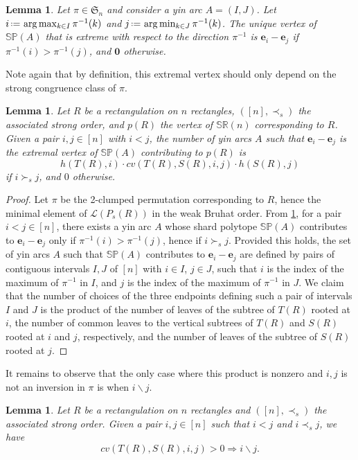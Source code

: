 \documentclass{amsart}
\newtheorem{lemma}[theorem]{Lemma}
\theoremstyle{definition}
\renewcommand{\b}[1]{{\boldsymbol{#1}}} %
\newcommand{\f}[1]{\mathfrak{#1}} %
\newcommand{\eqdef}{\mbox{\,\raisebox{0.2ex}{\scriptsize\ensuremath{\mathrm:}}\ensuremath{=}\,}} %
\renewcommand{\implies}{\Rightarrow} %
\newcommand{\polytope}[1]{\mathds{#1}} %
\newcommand{\SRP}{\polytope{SR}} %
\newcommand{\SP}{\polytope{SP}}
\begin{document}
\begin{lemma}
  \label{lem:yinminmax}
  Let $\pi\in\f{S}_n$ and consider a yin arc $A=(I,J)$.
  Let $i \eqdef \arg\max_{k\in I} \pi^{-1}(k)$ and $j \eqdef \arg\min_{k\in J} \pi^{-1}(k)$.
  The unique vertex of $\SP(A)$ that is extreme with respect to the direction $\pi^{-1}$
  is $\b{e}_i-\b{e}_j$ if $\pi^{-1}(i)>\pi^{-1}(j)$, and $\b{0}$ otherwise.
\end{lemma}

Note again that by definition, this extremal vertex should only depend on the strong congruence class of $\pi$.

\begin{lemma}
  Let $R$ be a rectangulation on $n$ rectangles, $([n],\prec_s)$ the associated strong order, and $p(R)$ the vertex of $\SRP(n)$ corresponding to $R$.
  Given a pair $i,j\in [n]$ with $i<j$, the number of yin arcs $A$ such that $\b{e}_i-\b{e}_j$
  is the extremal vertex of $\SP(A)$ contributing to $p(R)$ is
  \[
    h(T(R), i) \cdot cv (T(R), S(R), i, j)\cdot h(S(R), j) 
  \]
  if $i\succ_s j$, and $0$ otherwise.
\end{lemma}
\begin{proof}
  Let $\pi$ be the 2-clumped permutation corresponding to $R$, hence the minimal element of $\mathcal{L}(P_s(R))$ in the weak Bruhat order.
  From \cref{lem:yinminmax}, for a pair $i<j \in [n]$, there exists a yin arc $A$ whose shard polytope $\SP(A)$ contributes to $\b{e}_i-\b{e}_j$ only if
  $\pi^{-1}(i)>\pi^{-1}(j)$, hence if $i\succ_s j$.
  Provided this holds, the set of yin arcs $A$ such that $\SP(A)$ contributes to $\b{e}_i-\b{e}_j$ are defined by pairs of contiguous intervals $I,J$ of $[n]$ with $i\in I$, $j\in J$, such that $i$ is the index of the maximum of $\pi^{-1}$ in $I$, and $j$ is the index of the maximum of $\pi^{-1}$ in $J$.
  We claim that the number of choices of the three endpoints defining such a pair of intervals $I$ and $J$ is the product of the
  number of leaves of the subtree of $T(R)$ rooted at $i$, the number of common leaves to the vertical subtrees of $T(R)$ and $S(R)$ rooted
  at $i$ and $j$, respectively, and the number of leaves of the subtree of $S(R)$ rooted at $j$.
\end{proof}

It remains to observe that the only case where this product is nonzero and $i,j$ is not an inversion in $\pi$ is when $i\backslash j$.

\begin{lemma}
  Let $R$ be a rectangulation on $n$ rectangles and $([n],\prec_s)$ the associated strong order.
  Given a pair $i,j\in [n]$ such that $i<j$ and $i\prec_s j$, we have
  \[
    cv (T(R), S(R), i, j) > 0 \implies i\backslash j.
  \]
\end{lemma}
\end{document}
